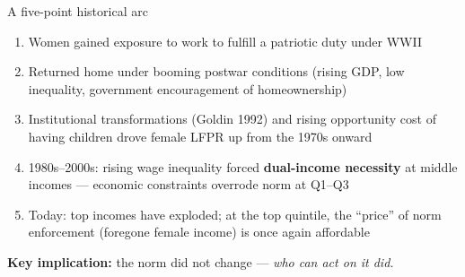 \documentclass[10pt,aspectratio=169]{beamer}
\begin{document}
\begin{frame}{A five-point historical arc}
  \begin{enumerate}
    \item Women gained exposure to work to fulfill a patriotic duty under WWII
    \item Returned home under booming postwar conditions (rising GDP, low
          inequality, government encouragement of homeownership)
    \item Institutional transformations (Goldin 1992) and rising opportunity
          cost of having children drove female LFPR up from the 1970s onward
    \item 1980s–2000s: rising wage inequality forced \textbf{dual-income necessity}
          at middle incomes — economic constraints overrode norm at Q1–Q3
    \item Today: top incomes have exploded; at the top quintile, the ``price''
          of norm enforcement (foregone female income) is once again affordable
  \end{enumerate}
  \medskip
  \textbf{Key implication:} the norm did not change — \emph{who can act on it did.}
\end{frame}
\end{document}
